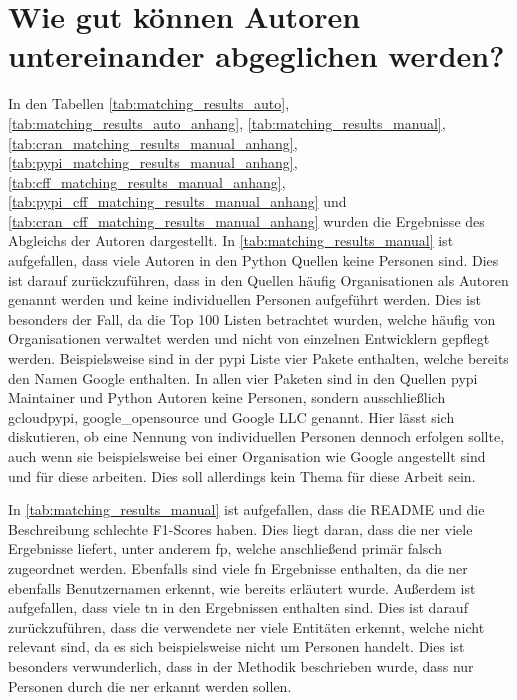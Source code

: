 \section{Wie gut können Autoren untereinander abgeglichen werden?}
\label{sec:abgleich_diskussion}
In den Tabellen \ref{tab:matching_results_auto}, \ref{tab:matching_results_auto_anhang}, \ref{tab:matching_results_manual},\ref{tab:cran_matching_results_manual_anhang}, \ref{tab:pypi_matching_results_manual_anhang}, \ref{tab:cff_matching_results_manual_anhang}, \ref{tab:pypi_cff_matching_results_manual_anhang} und \ref{tab:cran_cff_matching_results_manual_anhang} wurden die Ergebnisse des Abgleichs der Autoren dargestellt.
In \autoref{tab:matching_results_manual} ist aufgefallen, dass viele Autoren in den Python Quellen keine Personen sind.
Dies ist darauf zurückzuführen, dass in den Quellen häufig Organisationen als Autoren genannt werden und keine individuellen Personen aufgeführt werden.
Dies ist besonders der Fall, da die Top 100 Listen betrachtet wurden, welche häufig von Organisationen verwaltet werden und nicht von einzelnen Entwicklern gepflegt werden.
Beispielsweise sind in der \gls{pypi} Liste vier Pakete enthalten, welche bereits den Namen Google enthalten.
In allen vier Paketen sind in den Quellen \gls{pypi} Maintainer und Python Autoren keine Personen, sondern ausschließlich \glqq gcloudpypi\grqq{}, \glqq google\_opensource\grqq{} und \glqq Google LLC\grqq{} genannt.
Hier lässt sich diskutieren, ob eine Nennung von individuellen Personen dennoch erfolgen sollte, auch wenn sie beispielsweise bei einer Organisation wie Google angestellt sind und für diese arbeiten.
Dies soll allerdings kein Thema für diese Arbeit sein.

In \autoref{tab:matching_results_manual} ist aufgefallen, dass die README und die Beschreibung schlechte F1-Scores haben.
Dies liegt daran, dass die \gls{ner} viele Ergebnisse liefert, unter anderem \gls{fp}, welche anschließend primär falsch zugeordnet werden.
Ebenfalls sind viele \gls{fn} Ergebnisse enthalten, da die \gls{ner} ebenfalls Benutzernamen erkennt, wie bereits erläutert wurde.
Außerdem ist aufgefallen, dass viele \gls{tn} in den Ergebnissen enthalten sind.
Dies ist darauf zurückzuführen, dass die verwendete \gls{ner} viele Entitäten erkennt, welche nicht relevant sind, da es sich beispielsweise nicht um Personen handelt.
Dies ist besonders verwunderlich, dass in der Methodik beschrieben wurde, dass nur Personen durch die \gls{ner} erkannt werden sollen.

